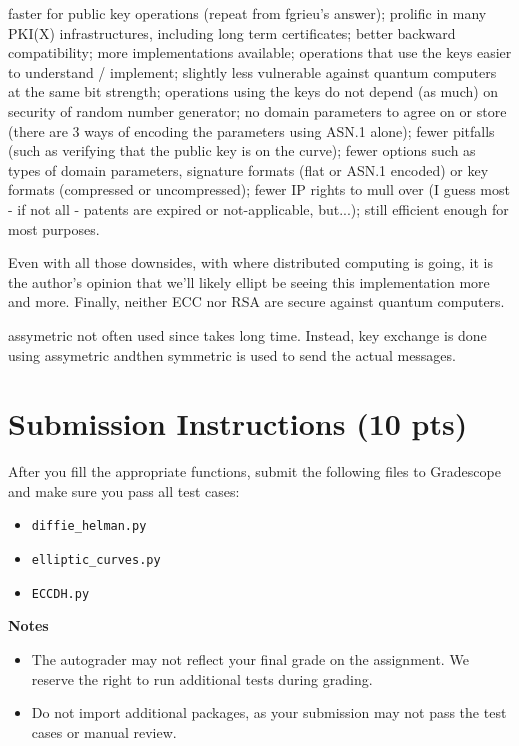 \documentclass{article}
\begin{document}
faster for public key operations (repeat from fgrieu's answer);
prolific in many PKI(X) infrastructures, including long term certificates;
better backward compatibility;
more implementations available;
operations that use the keys easier to understand / implement;
slightly less vulnerable against quantum computers at the same bit strength;
operations using the keys do not depend (as much) on security of random number generator;
no domain parameters to agree on or store (there are 3 ways of encoding the parameters using ASN.1 alone);
fewer pitfalls (such as verifying that the public key is on the curve);
fewer options such as types of domain parameters, signature formats (flat or ASN.1 encoded) or key formats (compressed or uncompressed);
fewer IP rights to mull over (I guess most - if not all - patents are expired or not-applicable, but...);
still efficient enough for most purposes.


Even with all those downsides, with where distributed computing is going, it is the author's opinion that we'll likely ellipt be seeing this implementation more and more. Finally, neither ECC nor RSA are secure against quantum computers.

assymetric not often used since takes long time. Instead, key exchange is done using assymetric andthen symmetric is used to send the actual messages.


\section*{Submission Instructions (10 pts)}
    After you fill the appropriate functions, submit the following files to Gradescope and make sure you pass all test cases:
    \begin{itemize}
        \item \lstinline{diffie_helman.py}
        \item \lstinline{elliptic_curves.py}
        \item \lstinline{ECCDH.py}
    \end{itemize}

    \vspace{3mm}
    \textbf{Notes}
    \begin{itemize}
        \item The autograder may not reflect your final grade on the assignment. We reserve the right to run additional tests during grading.
        \item Do not import additional packages, as your submission may not pass the test cases or manual review.
    \end{itemize}
\end{document}

